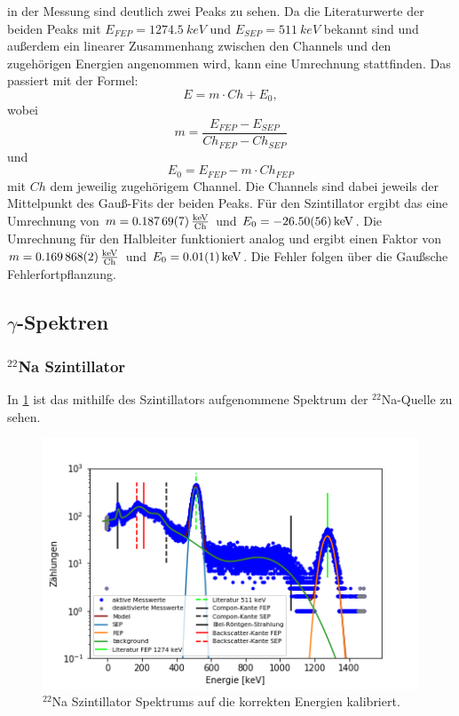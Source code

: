 in der Messung sind deutlich zwei Peaks zu sehen. Da die Literaturwerte der beiden Peaks mit $E_{FEP} = \SI{1274,5}{keV}$ und $E_{SEP} = \SI{511}{keV}$ bekannt sind und außerdem ein linearer Zusammenhang zwischen den Channels und den zugehörigen Energien angenommen wird, kann eine Umrechnung stattfinden.
Das passiert mit der Formel:
\begin{equation}
E = m \cdot Ch + E_{0},
\end{equation}  
wobei
\begin{equation}
m = \frac{E_{FEP} - E_{SEP}}{Ch_{FEP} - Ch_{SEP}}
\end{equation}
und 
\begin{equation}
E_{0} = E_{FEP} - m \cdot Ch_{FEP}
\end{equation}
mit $Ch$ dem jeweilig zugehörigem Channel. Die Channels sind dabei jeweils der Mittelpunkt des Gauß-Fits der beiden Peaks. Für den Szintillator ergibt das eine Umrechnung von $m = \SI{0,18769 \pm 0,00007}{\frac{keV}{Ch}}$ und $E_{0} = \SI{-26,5 \pm 0,56}{keV}$. Die Umrechnung für den Halbleiter funktioniert analog und ergibt einen Faktor von $m = \SI{0,169868 \pm 0,000002}{\frac{keV}{Ch}}$ und $E_{0} = \SI{0,01 \pm 0,01}{keV}$. Die Fehler folgen über die Gaußsche Fehlerfortpflanzung.



\subsection{$\gamma$-Spektren}

\subsubsection{$^{22}$Na Szintillator}
In \cref{na_sz} ist das mithilfe des Szintillators aufgenommene Spektrum der $^{22}$Na-Quelle zu sehen. 

\begin{figure}[ht]
	\centering
	\includegraphics[scale=0.8]{na_sz_.png}
	\caption{$^{22}$Na Szintillator Spektrums auf die korrekten Energien kalibriert.}
	\label{na_sz}
\end{figure}

